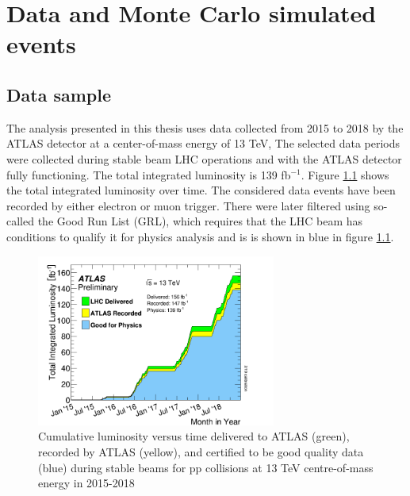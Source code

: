 
\chapter{Data and Monte Carlo simulated events}
\label{chap:data_MC}
\section{Data sample}
\label{sec:data_sample}

The analysis presented in this thesis uses data collected from 2015 to 2018 by the ATLAS detector at a center-of-mass energy of 13 TeV, The selected data periods were collected during stable beam LHC operations and with the ATLAS detector fully functioning. The total integrated luminosity is 139 fb$^{-1}$. Figure \ref{atlasluminosity} shows the total integrated luminosity over time. The considered data events have been recorded by either electron or muon trigger. There were later filtered using so-called the Good Run List (GRL), which requires that the LHC beam has conditions to qualify it for physics analysis and is is shown in blue in figure \ref{atlasluminosity}.

\begin{figure}[!h]
\centering
\includegraphics[width=0.7\textwidth]{ubonn-thesis/Chapters/Chapters_04/Figure/intlumivstimeRun2DQall.png}
\caption{Cumulative luminosity versus time delivered to ATLAS (green), recorded by ATLAS (yellow), and certified to be good quality data (blue) during stable beams for pp collisions at 13 TeV centre-of-mass energy in 2015-2018 \cite{ATLAS-CONF-2020-023}}
\label{atlasluminosity}
\end{figure}


